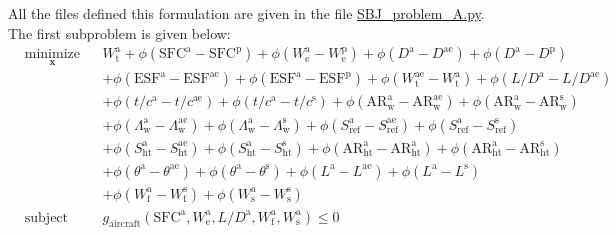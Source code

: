 \documentclass[11pt]{article}
\begin{document}
All the files defined this formulation are given in the file
\url{SBJ_problem_A.py}. The first subproblem is given below:
\begin{equation*}
    \begin{aligned}
        & \underset{\mathbf{x}}{\text{minimize}}
        & & W_{\mathrm{t}}^{\mathrm{a}}+\phi\left(\mathrm{SFC}^{\mathrm{a}}-\mathrm{SFC}^{\mathrm{p}}\right)+\phi\left(W_{\mathrm{e}}^{\mathrm{a}}-W_{\mathrm{e}}^{\mathrm{p}}\right)+\phi\left(D^{\mathrm{a}}-D^{\mathrm{ae}}\right)+\phi\left(D^{\mathrm{a}}-D^{\mathrm{p}}\right)\\
    & & & +\phi\left(\mathrm{ESF}^{\mathrm{a}}-\mathrm{ESF}^{\mathrm{ae}}\right)+\phi\left(\mathrm{ESF}^{\mathrm{a}}-\mathrm{ESF}^{\mathrm{p}}\right)+\phi\left(W_{\mathrm{t}}^{\mathrm{ae}}-W_{\mathrm{t}}^{\mathrm{a}}\right)+\phi\left(L / D^{\mathrm{a}}-L / D^{\mathrm{ae}}\right) \\
    & & & +\phi\left(t / c^{\mathrm{a}}-t / c^{\mathrm{ae}}\right)+\phi\left(t / c^{\mathrm{a}}-t / c^{\mathrm{s}}\right)+\phi\left(\mathrm{AR}_{\mathrm{w}}^{\mathrm{a}}-\mathrm{AR}_{\mathrm{w}}^{\mathrm{ae}}\right)+\phi\left(\mathrm{AR}_{\mathrm{w}}^{\mathrm{a}}-\mathrm{AR}_{\mathrm{w}}^{\mathrm{s}}\right) \\
    & & & +\phi\left(\Lambda_{\mathrm{w}}^{\mathrm{a}}-\Lambda_{\mathrm{w}}^{\mathrm{ae}}\right)+\phi\left(\Lambda_{\mathrm{w}}^{\mathrm{a}}-\Lambda_{\mathrm{w}}^{\mathrm{s}}\right)+\phi\left(S_{\mathrm{ref}}^{\mathrm{a}}-S_{\mathrm{ref}}^{\mathrm{ae}}\right)+\phi\left(S_{\mathrm{ref}}^{\mathrm{a}}-S_{\mathrm{ref}}^{\mathrm{s}}\right) \\
    & & & +\phi\left(S_{\mathrm{ht}}^{\mathrm{a}}-S_{\mathrm{ht}}^{\mathrm{ae}}\right)+\phi\left(S_{\mathrm{ht}}^{\mathrm{a}}-S_{\mathrm{ht}}^{\mathrm{s}}\right)+\phi\left(\mathrm{AR}_{\mathrm{ht}}^{\mathrm{a}}-\mathrm{AR}_{\mathrm{ht}}^{\mathrm{a}}\right)+\phi\left(\mathrm{AR}_{\mathrm{ht}}^{\mathrm{a}}-\mathrm{AR}_{\mathrm{ht}}^{\mathrm{s}}\right) \\
    & & & +\phi\left(\theta^{\mathrm{a}}-\theta^{\mathrm{ae}}\right)+\phi\left(\theta^{\mathrm{a}}-\theta^{\mathrm{s}}\right)+\phi\left(L^{\mathrm{a}}-L^{\mathrm{ae}}\right)+\phi\left(L^{\mathrm{a}}-L^{\mathrm{s}}\right) \\
    & & & +\phi\left(W_{\mathrm{f}}^{\mathrm{a}}-W_{\mathrm{f}}^{\mathrm{s}}\right)+\phi\left(W_{\mathrm{s}}^{\mathrm{a}}-W_{\mathrm{s}}^{\mathrm{s}}\right) \\
        & \text{subject to}
        & & g_{\mathrm{aircraft}}\left(\mathrm{SFC}^{\mathrm{a}}, W_{\mathrm{e}}^{\mathrm{a}}, L / D^{\mathrm{a}}, W_{\mathrm{f}}^{\mathrm{a}}, W_{\mathrm{s}}^{\mathrm{a}}\right) \leq 0\\

\end{aligned}
\end{equation*}
\end{document}
